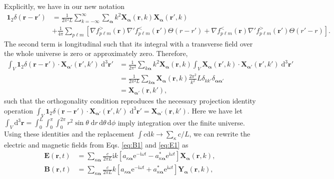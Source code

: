 \documentclass{article}
\numberwithin{equation}{section}
\begin{document}
Explicitly, we have in our new notation
\begin{equation}\label{eq:boxCompleteness}
\begin{split}
\bm{1}_2\delta(\mathbf{r}- \mathbf{r}') &= \frac{1}{2\pi^2L}\sum_{k = -\infty}^\infty\sum_{\bm{\alpha}}k^2\mathbf{X}_{\bm{\alpha}}(\mathbf{r},k)\mathbf{X}_{\bm{\alpha}}(\mathbf{r}',k)\\
&+ \frac{1}{4\pi}\sum_{p\ell m}\left[\nabla f_{p\ell m}^>(\mathbf{r})\nabla'f_{p\ell m}^<(\mathbf{r}')\Theta(r - r') + \nabla f_{p\ell m}^<(\mathbf{r})\nabla'f_{p\ell m}^>(\mathbf{r}')\Theta(r' - r)\right].
\end{split}
\end{equation}
The second term is longitudinal such that its integral with a transverse field over the whole universe is zero or approximately zero. Therefore,
\begin{equation}
\begin{split}
\int_V\bm{1}_2\delta(\mathbf{r} - \mathbf{r}')\cdot\mathbf{X}_{\bm{\alpha}'}(\mathbf{r}',k')\;\mathrm{d}^3\mathbf{r}' &= \frac{1}{2\pi^2}\sum_{k\bm{\alpha}}k^2\mathbf{X}_{\bm{\alpha}}(\mathbf{r},k)\int_V\mathbf{X}_{\bm{\alpha}}(\mathbf{r}',k)\cdot\mathbf{X}_{\bm{\alpha}'}(\mathbf{r}',k')\;\mathrm{d}^3\mathbf{r}'\\
&= \frac{1}{2\pi^2L}\sum_{k\bm{\alpha}}\mathbf{X}_{\bm{\alpha}}(\mathbf{r},k)\frac{2\pi^2}{k^2}L\delta_{kk'}\delta_{\bm{\alpha}\bm{\alpha}'}\\
&= \mathbf{X}_{\bm{\alpha}'}(\mathbf{r},k'),
\end{split}
\end{equation}
such that the orthogonality condition reproduces the necessary projection identity operation $\int_V\bm{1}_2\delta(\mathbf{r} - \mathbf{r}')\cdot\mathbf{X}_{\bm{\alpha}'}(\mathbf{r}',k')\;\mathrm{d}^3\mathbf{r}' = \mathbf{X}_{\bm{\alpha}'}(\mathbf{r},k')$. Here we have let $\int_V\mathrm{d}^3\mathbf{r} = \int_0^L\int_0^\pi\int_0^{2\pi}r^2\sin\theta\;\mathrm{d}r\,\mathrm{d}\theta\,\mathrm{d}\phi$ imply integration over the finite universe. Using these identities and the replacement $\int c\mathrm{d}k\to\sum_{\kappa}c/L$, we can rewrite the electric and magnetic fields from Eqs. \eqref{eq:B1} and \eqref{eq:E1} as
\begin{equation}
\begin{split}
\mathbf{E}(\mathbf{r},t) &= \sum_{\kappa\bm{\alpha}}\frac{c}{2\pi L}\mathrm{i}k\left[a_{\kappa\bm{\alpha}}\mathrm{e}^{-\mathrm{i}\omega t} - a_{\kappa\bm{\alpha}}^*\mathrm{e}^{\mathrm{i}\omega t}\right]\mathbf{X}_{\bm{\alpha}}(\mathbf{r},k),\\
\mathbf{B}(\mathbf{r},t) &= \sum_{\kappa\bm{\alpha}}\frac{c}{2\pi L}k\left[a_{\kappa\bm{\alpha}}\mathrm{e}^{-\mathrm{i}\omega t} + a_{\kappa\bm{\alpha}}^*\mathrm{e}^{\mathrm{i}\omega t}\right]\mathbf{Y}_{\bm{\alpha}}(\mathbf{r},k),
\end{split}
\end{equation}
\end{document}

